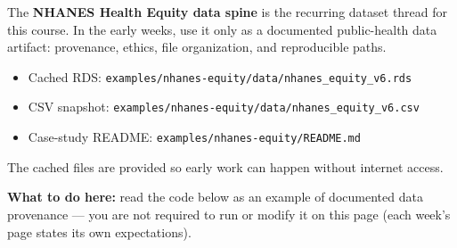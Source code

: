 \documentclass[
  letterpaper,
  DIV=11,
  numbers=noendperiod,
  oneside]{scrreprt}
\providecommand{\tightlist}{%
  \setlength{\itemsep}{0pt}\setlength{\parskip}{0pt}}
\begin{document}
The \textbf{NHANES Health Equity data spine} is the recurring dataset
thread for this course. In the early weeks, use it only as a documented
public-health data artifact: provenance, ethics, file organization, and
reproducible paths.

\begin{itemize}
\tightlist
\item
  Cached RDS:
  \texttt{examples/nhanes-equity/data/nhanes\_equity\_v6.rds}
\item
  CSV snapshot:
  \texttt{examples/nhanes-equity/data/nhanes\_equity\_v6.csv}
\item
  Case-study README: \texttt{examples/nhanes-equity/README.md}
\end{itemize}

The cached files are provided so early work can happen without internet
access.

\textbf{What to do here:} read the code below as an example of
documented data provenance --- you are not required to run or modify it
on this page (each week's page states its own expectations).
\end{document}
